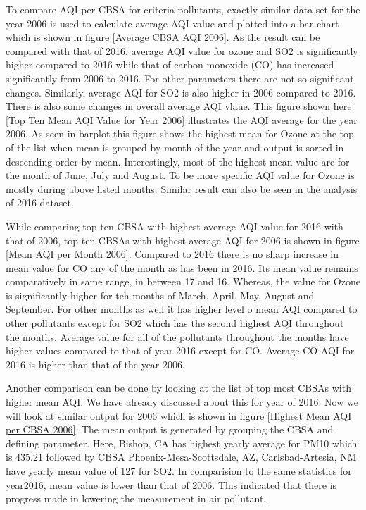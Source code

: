 \documentclass[sigconf]{acmart}
\begin{document}
   To compare AQI per CBSA for criteria pollutants, exactly similar data set for the year 2006 is used to calculate average AQI value and plotted into a bar chart which is shown in figure \ref{Average CBSA AQI 2006}. As the result can be compared with that of 2016.
   average AQI  value for ozone and SO2 is significantly higher compared to 2016 while that of carbon monoxide (CO) has increased significantly from 2006 to 2016. For other parameters there are not so significant changes. Similarly, average AQI for SO2 is also higher in 2006 compared to 2016. 
   There is also some changes in overall average AQI vlaue. This figure shown here \ref{Top Ten Mean AQI Value for Year 2006} illustrates the AQI average for the year 2006. As seen in barplot this figure shows the highest mean for Ozone at the top of the list when mean is grouped by month of the year and output is sorted in descending order by mean. Interestingly, most of the highest mean value are for the month of June, July and August. To be more specific AQI value for Ozone is mostly during above listed months. Similar result can also be seen in the  analysis of 2016 dataset.

   While comparing top ten CBSA with highest average AQI value for 2016 with that of 2006, top ten CBSAs with highest average AQI for 2006 is shown in figure \ref{Mean AQI per Month 2006}. Compared to 2016 there is no sharp increase in mean value for CO any of the month as has been in 2016. Its mean value remains comparatively in same range, in between 17 and 16. Whereas, the value for Ozone is significantly higher for teh months of March, April, May, August and September. For other months as well it has higher level o mean AQI compared to other pollutants except for SO2 which has the second highest AQI throughout the months. Average value for all of the pollutants throughout the months have higher values compared to that of year 2016 except for CO. Average CO AQI for 2016 is higher than that of the year 2006. 

   Another comparison can be done by looking at the list of top most CBSAs with higher mean AQI. We have already discussed about this for year of 2016.  Now we will look at similar output for 2006 which is shown in figure \ref{Highest Mean AQI per CBSA 2006}. The mean output is generated by grouping the CBSA and defining parameter. Here, Bishop, CA has highest yearly average for PM10 which is 435.21 followed by CBSA Phoenix-Mesa-Scottsdale, AZ, Carlsbad-Artesia, NM have yearly mean value of 127 for SO2. In comparision to the same statistics for year2016,  mean value is lower than that of 2006. This indicated that there is progress made in lowering the measurement in air pollutant.
\end{document}

